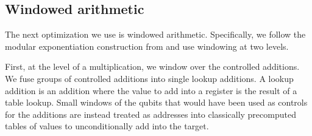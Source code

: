\documentclass[superscriptaddress,notitlepage,longbibliography]{revtex4-1}
\theoremstyle{definition}
\theoremstyle{definition}
\begin{document}
\subsection{Windowed arithmetic}

The next optimization we use is windowed arithmetic.
Specifically, we follow the modular exponentiation construction from \cite{gidney2019windowedarithmetic} and use windowing at two levels.

First, at the level of a multiplication, we window over the controlled additions.
We fuse groups of controlled additions into single lookup additions.
A lookup addition is an addition where the value to add into a register is the result of a table lookup.
Small windows of the qubits that would have been used as controls for the additions are instead treated as addresses into classically precomputed tables of values to unconditionally add into the target.
\end{document}
